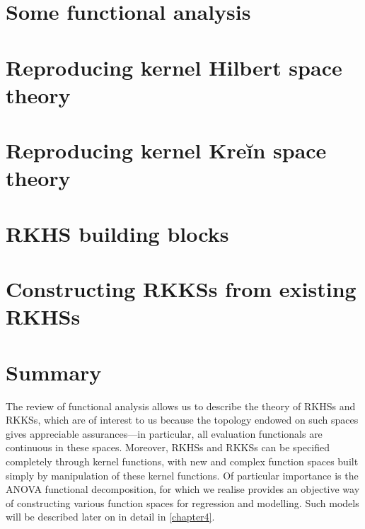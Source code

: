 \documentclass[showframe,11pt,twoside,openright]{report}
\begin{document}
%

\section{Some functional analysis}\label{sec:funcanalysis}


\section{Reproducing kernel Hilbert space theory}\label{sec:rkhstheory}


\section{Reproducing kernel Kreĭn space theory}\label{sec:rkkstheory}


\section{RKHS building blocks}\label{sec:rkhsbuild}


\section{Constructing RKKSs from existing RKHSs}\label{sec:constructrkks}


\section{Summary}\label{sec:summarychapter2}

The review of functional analysis allows us to describe the theory of RKHSs and RKKSs, which are of interest to us because the topology endowed on such spaces gives appreciable assurances---in particular, all evaluation functionals are continuous in these spaces.
Moreover, RKHSs and RKKSs can be specified completely through kernel functions, with new and complex function spaces built simply by manipulation of these kernel functions.
Of particular importance is the ANOVA functional decomposition, for which we realise provides an objective way of constructing various function spaces for regression and modelling. 
Such models will be described later on in detail in \cref{chapter4}.
\end{document}
